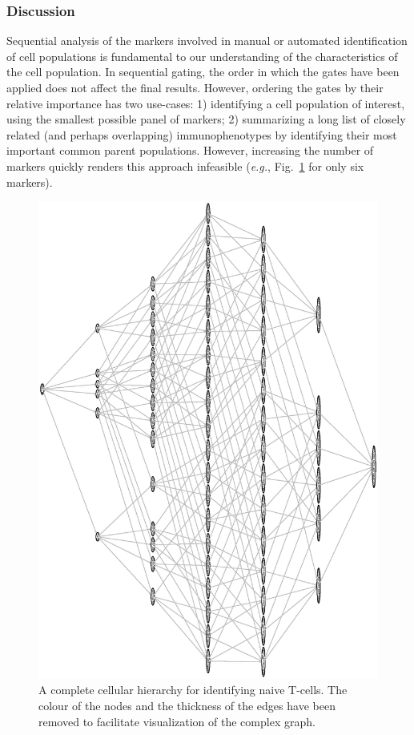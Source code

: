 \subsubsection{Discussion}
Sequential analysis of the markers involved in manual or automated identification of cell populations is fundamental to our understanding of the characteristics of the cell population.
In sequential gating, the order in which the gates have been applied does not affect the final results.
However, ordering the gates by their relative importance has two use-cases: 1) identifying a cell population of interest, using the smallest possible panel of markers; 2) summarizing a long list of closely related (and perhaps overlapping) immunophenotypes by identifying their most important common parent populations.
However, increasing the number of markers quickly renders this approach infeasible (\emph{e.g.}, Fig.~\ref{r1:NaiveOverlapComplete} for only six markers).

\begin{figure}[!ht]
  \begin{center}
    \includegraphics[width=.8\textwidth, angle=270]{figs/rchy/figs/NaiveOverlapComplete}
  \end{center}
  \caption{A complete cellular hierarchy for identifying naive T-cells. The colour of the nodes and the thickness of the edges have been removed to facilitate visualization of the complex graph.
  }
  \label{r1:NaiveOverlapComplete}
\end{figure}

